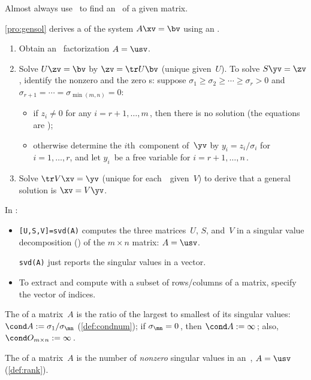 \begin{itemize}
Almost always use \script\ to find an \svd\ of a given matrix.

\itemhi \cref{pro:gensol} derives a  of the system $A\xv=\bv$ using an \svd.
\begin{enumerate}
\item Obtain an \svd\ factorization \(A=\usv\).
\item Solve \(U\zv=\bv\) by $\zv=\tr U\bv$ (unique given~\(U\)).
\itemme To solve \(S\yv=\zv\), identify the nonzero and the zero s: suppose \(\sigma_1\geq\sigma_2\geq\cdots\geq\sigma_r>0\) and \(\sigma_{r+1}=\cdots=\sigma_{\min(m,n)}=0\):
\begin{itemize}
\item if $z_i\neq0$ for any \(i=r+1,\ldots,m\)\,, then there is {no solution} (the equations are );
\item otherwise determine the $i$th~component of~$\yv$ by
$y_i=z_i/\sigma_i$ for $i=1,\ldots,r$, and let $y_i$~be a {free variable} for $i=r+1,\ldots,n$\,. 
\end{itemize}

\item Solve \(\tr V\xv=\yv\) (unique for each~\yv\ given~\(V\)) to derive that a general solution is $\xv=V\yv$.
\end{enumerate}

\itemhi In \script:
\begin{itemize}
\item {}\verb|[U,S,V]=svd(A)| computes the three matrices~\(U\), \(S\), and~\(V\) in a singular value decomposition (\svd) of the \(m\times n\) matrix: \(A=\usv\).

\verb|svd(A)| just reports the singular values in a vector.

\item To extract and compute with a subset of rows\slash columns of a matrix, specify the vector of indices.
\end{itemize}


\itemme The  of a matrix~\(A\) is the ratio of the largest to smallest of its {singular value}s: \(\cond A:=\sigma_1/\sigma_{\mn}\) (\cref{def:condnum}); 
if \(\sigma_{\mn}=0\)\,, then \(\cond A:=\infty\)\,; 
also, \(\cond O_{m\times n}:=\infty\)\,.

\itemhi The  of a matrix~$A$ is the number of \emph{nonzero} {singular value}s in an~\svd, \(A=\usv\) (\cref{def:rank}).


\end{itemize}
